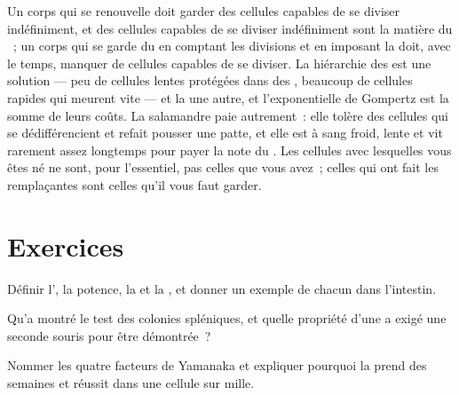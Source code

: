 \begin{remark}\label{rem:b3:stem-cells:remark}
Un corps qui se renouvelle doit garder des cellules capables de se
diviser indéfiniment, et des cellules capables de se diviser
indéfiniment sont la matière du ~; un corps qui se garde du 
en comptant les divisions et en imposant la  doit, avec le
temps, manquer de cellules capables de se diviser. La hiérarchie des
 est une solution --- peu de cellules lentes protégées
dans des , beaucoup de cellules rapides qui meurent vite --- et la
 une autre, et l'exponentielle de Gompertz est la
somme de leurs coûts. La salamandre paie autrement~: elle tolère des
cellules qui se dédifférencient et refait pousser une patte, et elle est
à sang froid, lente et vit rarement assez longtemps pour payer la note
du . Les cellules avec lesquelles vous êtes né ne sont, pour
l'essentiel, pas celles que vous avez~; celles qui ont fait les
remplaçantes sont celles qu'il vous faut garder.
\end{remark}

\section{Exercices}

\begin{exercise}[$\star$]\label{exo:b3:stem-cells:1}
Définir l', la potence, la  et la , et donner un exemple de chacun dans
l'intestin.
\end{exercise}

\begin{exercise}[$\star$]\label{exo:b3:stem-cells:2}
Qu'a montré le test des colonies spléniques, et quelle propriété d'une
 a exigé une seconde souris pour être démontrée~?
\end{exercise}

\begin{exercise}[$\star$]\label{exo:b3:stem-cells:3}
Nommer les quatre facteurs de Yamanaka et expliquer pourquoi la
 prend des semaines et réussit dans une cellule sur mille.
\end{exercise}

